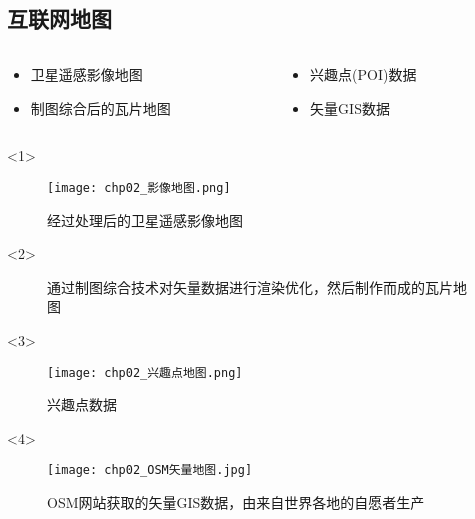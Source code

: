 \subsection{互联网地图}
\begin{frame}[t]{\subsecname}
  \begin{columns}[T]
     \begin{column}[T]{0.5\textwidth}
     \begin{itemize}
        \item<1-> 卫星遥感影像地图
        \item<2-> 制图综合后的瓦片地图
     \end{itemize} \end{column}

     \begin{column}[T]{0.5\textwidth}
     \begin{itemize}
        \item<3-> 兴趣点(POI)数据
        \item<4-> 矢量GIS数据
     \end{itemize} \end{column}
  \end{columns}

\begin{overlayarea}{\textwidth}{\textheight}
  \begin{onlyenv}<1>
\begin{figure}
  \centering
  \texttt{[image: chp02\_影像地图.png]}
  \caption{经过处理后的卫星遥感影像地图}
\end{figure}
  \end{onlyenv}

\vspace{-10pt}
  \begin{onlyenv}<2>
\begin{figure}\centering
    \vspace{1pt} 
    \caption{通过制图综合技术对矢量数据进行渲染优化，然后制作而成的瓦片地图}
\end{figure}
  \end{onlyenv}

  \begin{onlyenv}<3>
\begin{figure}
  \centering
  \texttt{[image: chp02\_兴趣点地图.png]}
  \caption{兴趣点数据}
\end{figure}
  \end{onlyenv}

  \begin{onlyenv}<4>
\begin{figure}
  \centering
  \texttt{[image: chp02\_OSM矢量地图.jpg]}
  \caption{OSM网站获取的矢量GIS数据，由来自世界各地的自愿者生产}
\end{figure}
  \end{onlyenv}
\end{overlayarea}

\end{frame}

